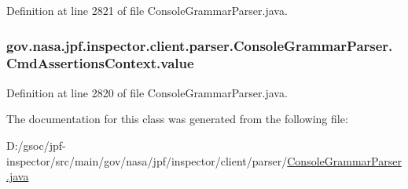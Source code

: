 Definition at line 2821 of file Console\+Grammar\+Parser.\+java.

\subsubsection[{\texorpdfstring{value}{value}}]{ gov.\+nasa.\+jpf.\+inspector.\+client.\+parser.\+Console\+Grammar\+Parser.\+Cmd\+Assertions\+Context.\+value}\hypertarget{classgov_1_1nasa_1_1jpf_1_1inspector_1_1client_1_1parser_1_1_console_grammar_parser_1_1_cmd_assertions_context_a1223d76e5ce0080f547e8e85a8683db1}{}\label{classgov_1_1nasa_1_1jpf_1_1inspector_1_1client_1_1parser_1_1_console_grammar_parser_1_1_cmd_assertions_context_a1223d76e5ce0080f547e8e85a8683db1}


Definition at line 2820 of file Console\+Grammar\+Parser.\+java.



The documentation for this class was generated from the following file\+:\begin{DoxyCompactItemize}
\item 
D\+:/gsoc/jpf-\/inspector/src/main/gov/nasa/jpf/inspector/client/parser/\hyperlink{_console_grammar_parser_8java}{Console\+Grammar\+Parser.\+java}\end{DoxyCompactItemize}
